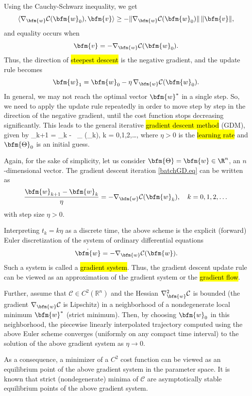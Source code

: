 Using the Cauchy-Schwarz inequality, we get
$$
\langle \nabla_{\bfm{w}} \mathcal{C}(\bfm{w}_0), \bfm{v} \rangle \ge -\| \nabla_{\bfm{w}} \mathcal{C}(\bfm{w}_0)\| \, \|\bfm{v}\|,
$$
and equality occurs when
$$\bfm{v} = -\nabla_{\bfm{w}} \mathcal{C}(\bfm{w}_0).$$
Thus, the direction of \hl{steepest descent} is the negative gradient, and the update rule becomes
$$
\bfm{w}_1 = \bfm{w}_0 - \eta \, \nabla_{\bfm{w}} \mathcal{C}(\bfm{w}_0).
$$
In general, we may not reach the optimal vector $\bfm{w}^*$ in a single step. So, we need to apply the update rule repeatedly in order to move step by step in the direction of the negative gradient, until the cost function stops decreasing significantly.
This leads to the general iterative \hl{gradient descent method} (GDM), given by
\bea\label{batchGD.eq}
\bfm{\Theta}_{k+1} = \bfm{\Theta}_{k} - \eta \, \nabla_{\boldsymbol{\Theta}} (\bfm{\Theta}_{k}), 
\quad k = 0,1,2,\dots,
\eea
where $\eta > 0$ is the \hl{learning rate} and $\bfm{\Theta}_{0}$ is an initial guess.

\begin{remark}
\label{gradient.system.rem}
Again, for the sake of simplicity, let us consider $\bfm{\Theta} = \bfm{w} \in \R^n$, an $n$-dimensional vector. 
The gradient descent iteration \eqref{batchGD.eq} can be written as 
$$
\frac{\bfm{w}_{k+1} - \bfm{w}_{k}}{\eta} = - \nabla_{\bfm{w}} \mathcal{C}(\bfm{w}_{k}), 
\quad k = 0,1,2,\dots
$$
with step size $\eta>0$.

Interpreting $t_k=k\eta$ as a discrete time, the above scheme is the explicit (forward) Euler discretization of the system of ordinary differential equations
$$
\dot{\bfm{w}} = - \nabla_{\bfm{w}} \mathcal{C}(\bfm{w}).
$$
Such a system is called a \hl{gradient system}.  Thus, the gradient descent update rule can be viewed as an approximation  of the gradient system or the \hl{gradient flow}.

Further, assume that $\mathcal{C}\in C^2(\mathbb{R}^n)$ and the Hessian $\nabla_{\bfm{w}}^2 \mathcal{C}$ is bounded (the gradient $\nabla_{\bfm{w}}\mathcal{C}$ is Lipschitz) in a neighborhood of a nondegenerate local minimum $\bfm{w}^*$ (strict minimum). Then, by choosing $\bfm{w}_0$ in this neighborhood, the piecewise linearly interpolated trajectory computed using the above Euler scheme converges (uniformly on any compact time interval) to the  solution of the above gradient system as $\eta \rightarrow 0$.

As a consequence, a minimizer of a $C^2$ cost function can be viewed as an equilibrium point of the above gradient system in the parameter space. It is known that strict (nondegenerate) minima of $\mathcal{C}$ are asymptotically stable equilibrium points of the above gradient system.

\end{remark}


